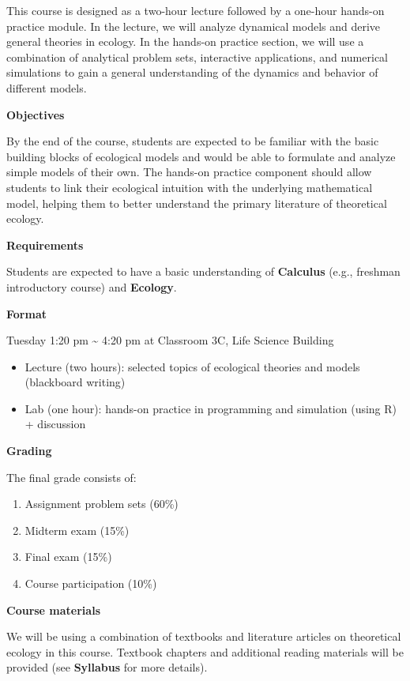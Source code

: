 \documentclass[
]{book}
\providecommand{\tightlist}{%
  \setlength{\itemsep}{0pt}\setlength{\parskip}{0pt}}
\begin{document}
This course is designed as a two-hour lecture followed by a one-hour hands-on practice module. In the lecture, we will analyze dynamical models and derive general theories in ecology. In the hands-on practice section, we will use a combination of analytical problem sets, interactive applications, and numerical simulations to gain a general understanding of the dynamics and behavior of different models.

\textbf{Objectives}

By the end of the course, students are expected to be familiar with the basic building blocks of ecological models and would be able to formulate and analyze simple models of their own. The hands-on practice component should allow students to link their ecological intuition with the underlying mathematical model, helping them to better understand the primary literature of theoretical ecology.

\textbf{Requirements}

Students are expected to have a basic understanding of \textbf{Calculus} (e.g., freshman introductory course) and \textbf{Ecology}.

\textbf{Format}

Tuesday 1:20 pm \textasciitilde{} 4:20 pm at Classroom 3C, Life Science Building

\begin{itemize}
\tightlist
\item
  Lecture (two hours): selected topics of ecological theories and models (blackboard writing)
\item
  Lab (one hour): hands-on practice in programming and simulation (using R) + discussion
\end{itemize}

\textbf{Grading}

The final grade consists of:

\begin{enumerate}
\def\labelenumi{(\arabic{enumi})}
\tightlist
\item
  Assignment problem sets (60\%)
\item
  Midterm exam (15\%)
\item
  Final exam (15\%)
\item
  Course participation (10\%)
\end{enumerate}

\textbf{Course materials}

We will be using a combination of textbooks and literature articles on theoretical ecology in this course. Textbook chapters and additional reading materials will be provided (see \textbf{Syllabus} for more details).
\end{document}
